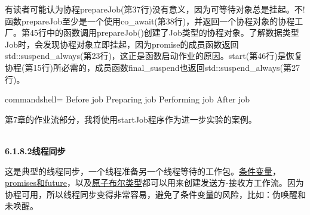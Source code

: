 有读者可能认为协程prepareJob(第37行)没有意义，因为可等待对象总是挂起。不!函数prepareJob至少是一个使用co\_await(第38行)，并返回一个协程对象的协程工厂。第45行中的函数调用prepareJob()创建了Job类型的协程对象。了解数据类型Job时，会发现协程对象立即挂起，因为promise的成员函数返回std::suspend\_always(第23行)，这正是函数启动作业的原因。start(第46行)是恢复协程(第15行)所必需的，成员函数final\_suspend也返回std::suspend\_always(第27行)。

\begin{tcblisting}{commandshell={}}
Before job
    Preparing job
    Performing job
After job
\end{tcblisting}

第7章的作业流部分，我将使用startJob程序作为进一步实验的案例。

\hspace*{\fill} \\ %
\noindent
\textbf{6.1.8.2\hspace{0.2cm}线程同步}

这是典型的线程同步，一个线程准备另一个线程等待的工作包。\href{https://en.cppreference.com/w/cpp/thread/condition_variable}{条件变量}， \href{https://en.cppreference.com/w/cpp/thread}{promises和future}，以及\href{https://en.cppreference.com/w/cpp/atomic/atomic}{原子布尔类型}都可以用来创建发送方-接收方工作流。因为协程可用，所以线程同步变得非常容易，避免了条件变量的风险，比如：伪唤醒和未唤醒。

